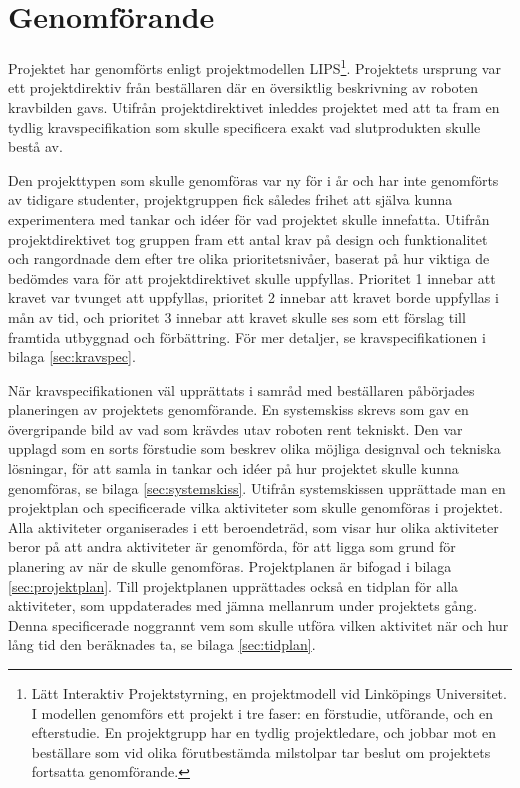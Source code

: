 

\section{Genomförande}

Projektet har genomförts enligt projektmodellen LIPS\footnote{Lätt Interaktiv Projektstyrning, en projektmodell vid Linköpings Universitet. I modellen genomförs ett projekt i tre faser: en förstudie, utförande, och en efterstudie. En projektgrupp har en tydlig projektledare, och jobbar mot en beställare som vid olika förutbestämda milstolpar tar beslut om projektets fortsatta genomförande.}. Projektets ursprung var ett projektdirektiv från beställaren där en översiktlig beskrivning av roboten  kravbilden gavs. Utifrån projektdirektivet inleddes projektet med att ta fram en tydlig kravspecifikation som skulle specificera exakt vad slutprodukten skulle bestå av.

Den projekttypen som skulle genomföras var ny för i år och har inte genomförts av tidigare studenter, projektgruppen fick således frihet att själva kunna experimentera med tankar och idéer för vad projektet skulle innefatta. Utifrån projektdirektivet tog gruppen fram ett antal krav på design och funktionalitet och rangordnade dem efter tre olika prioritetsnivåer, baserat på hur viktiga de bedömdes vara för att projektdirektivet skulle uppfyllas. Prioritet 1 innebar att kravet var tvunget att uppfyllas, prioritet 2 innebar att kravet borde uppfyllas i mån av tid, och prioritet 3 innebar att kravet skulle ses som ett förslag till framtida utbyggnad och förbättring. För mer detaljer, se kravspecifikationen i bilaga \ref{sec:kravspec}.

När kravspecifikationen väl upprättats i samråd med beställaren påbörjades planeringen av projektets genomförande. En systemskiss skrevs som gav en övergripande bild av vad som krävdes utav roboten rent tekniskt. Den var upplagd som en sorts förstudie som beskrev olika möjliga designval och tekniska lösningar, för att samla in tankar och idéer på hur projektet skulle kunna genomföras, se bilaga \ref{sec:systemskiss}. Utifrån systemskissen upprättade man en projektplan och specificerade vilka aktiviteter som skulle genomföras i projektet. Alla aktiviteter organiserades i ett beroendeträd, som visar hur olika aktiviteter beror på att andra aktiviteter är genomförda, för att ligga som grund för planering av när de skulle genomföras. Projektplanen är bifogad i bilaga \ref{sec:projektplan}. Till projektplanen upprättades också en tidplan för alla aktiviteter, som uppdaterades med jämna mellanrum under projektets gång. Denna specificerade noggrannt vem som skulle utföra vilken aktivitet när och hur lång tid den beräknades ta, se bilaga \ref{sec:tidplan}.

